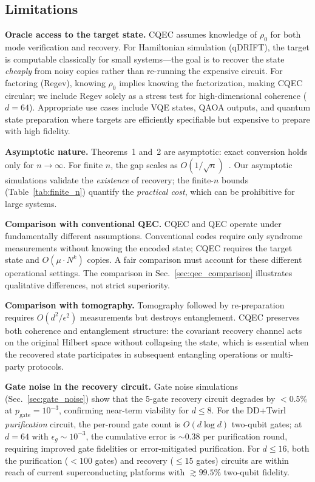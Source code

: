 \documentclass[a4paper,twocolumn]{quantumarticle}
\begin{document}
\subsection{Limitations}
\label{sec:limitations}

\textbf{Oracle access to the target state.}
CQEC assumes knowledge of $\rho_0$ for both mode verification and recovery.
For Hamiltonian simulation (qDRIFT), the target is computable classically for small systems---the goal is to recover the state \emph{cheaply} from noisy copies rather than re-running the expensive circuit.
For factoring (Regev), knowing $\rho_0$ implies knowing the factorization, making CQEC circular; we include Regev solely as a stress test for high-dimensional coherence ($d = 64$).
Appropriate use cases include VQE states, QAOA outputs, and quantum state preparation where targets are efficiently specifiable but expensive to prepare with high fidelity.

\textbf{Asymptotic nature.}
Theorems~1 and~2 are asymptotic: exact conversion holds only for $n \to \infty$.
For finite $n$, the gap scales as $O(1/\sqrt{n})$~\cite{Shiraishi2024}.
Our asymptotic simulations validate the \emph{existence} of recovery; the finite-$n$ bounds (Table~\ref{tab:finite_n}) quantify the \emph{practical cost}, which can be prohibitive for large systems.

\textbf{Comparison with conventional QEC.}
CQEC and QEC operate under fundamentally different assumptions.
Conventional codes require only syndrome measurements without knowing the encoded state; CQEC requires the target state and $O(\mu \cdot N^k)$ copies.
A fair comparison must account for these different operational settings.
The comparison in Sec.~\ref{sec:qec_comparison} illustrates qualitative differences, not strict superiority.

\textbf{Comparison with tomography.}
Tomography followed by re-preparation requires $O(d^2/\epsilon^2)$ measurements but destroys entanglement.
CQEC preserves both coherence and entanglement structure: the covariant recovery channel acts on the original Hilbert space without collapsing the state, which is essential when the recovered state participates in subsequent entangling operations or multi-party protocols.

\textbf{Gate noise in the recovery circuit.}
Gate noise simulations (Sec.~\ref{sec:gate_noise}) show that the 5-gate recovery circuit degrades by $< 0.5\%$ at $p_\mathrm{gate} = 10^{-3}$, confirming near-term viability for $d \leq 8$.
For the DD+Twirl \emph{purification} circuit, the per-round gate count is $O(d \log d)$ two-qubit gates; at $d = 64$ with $\epsilon_g \sim 10^{-3}$, the cumulative error is $\sim\!0.38$ per purification round, requiring improved gate fidelities or error-mitigated purification.
For $d \leq 16$, both the purification ($<\!100$ gates) and recovery ($\leq 15$ gates) circuits are within reach of current superconducting platforms with $\gtrsim\!99.5\%$ two-qubit fidelity.
\end{document}

